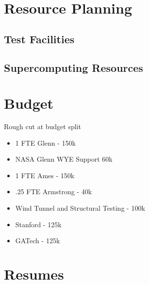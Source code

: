 \documentclass[]{report}
\begin{document}
  \section{Resource Planning}
    \subsection{Test Facilities}
    \subsection{Supercomputing Resources}

  \appendix
  \section{Budget}
    Rough cut at budget split
    \begin{itemize}
        \item 1 FTE Glenn - 150k 
        \item NASA Glenn WYE Support 60k 
        \item 1 FTE Ames - 150k 
        \item .25 FTE Armstrong - 40k
        \item Wind Tunnel and Structural Testing - 100k 
        \item Stanford - 125k 
        \item GATech - 125k
    \end{itemize}

  \section{Resumes}

  
\end{document}
